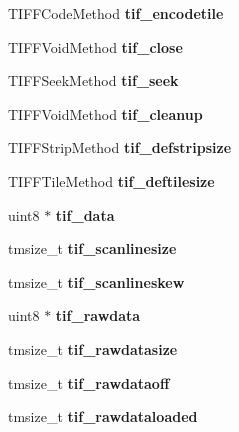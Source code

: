 \begin{DoxyCompactItemize}
T\+I\+F\+F\+Code\+Method {\bfseries tif\+\_\+encodetile}
\item 
\mbox{\label{structtiff_aa7bef3ea331dfead591fa3ee328c2f89}} 
T\+I\+F\+F\+Void\+Method {\bfseries tif\+\_\+close}
\item 
\mbox{\label{structtiff_a1db2f47aa654fbf73a49847336f5a2ab}} 
T\+I\+F\+F\+Seek\+Method {\bfseries tif\+\_\+seek}
\item 
\mbox{\label{structtiff_ab38b688dbaac74b1587df2ab116e37f3}} 
T\+I\+F\+F\+Void\+Method {\bfseries tif\+\_\+cleanup}
\item 
\mbox{\label{structtiff_a6ea2d3cd462422a878877abe7b7b5010}} 
T\+I\+F\+F\+Strip\+Method {\bfseries tif\+\_\+defstripsize}
\item 
\mbox{\label{structtiff_a0d76e386a076004d16128b626603d55d}} 
T\+I\+F\+F\+Tile\+Method {\bfseries tif\+\_\+deftilesize}
\item 
\mbox{\label{structtiff_a8b63d8d183e7208b9bbd0354addb48cd}} 
uint8 $\ast$ {\bfseries tif\+\_\+data}
\item 
\mbox{\label{structtiff_a3497c1342a559a5a2fb1448e84594cc6}} 
tmsize\+\_\+t {\bfseries tif\+\_\+scanlinesize}
\item 
\mbox{\label{structtiff_a961f4a36ee1b1d0cfb8fd5fec5c2c97f}} 
tmsize\+\_\+t {\bfseries tif\+\_\+scanlineskew}
\item 
\mbox{\label{structtiff_af8ccc5951016dacf6335319b85edfe0d}} 
uint8 $\ast$ {\bfseries tif\+\_\+rawdata}
\item 
\mbox{\label{structtiff_ac74efe21c3a3ca6be7ac108bcb5a9e7f}} 
tmsize\+\_\+t {\bfseries tif\+\_\+rawdatasize}
\item 
\mbox{\label{structtiff_acccfff166f9648fc8e5209bba7dd46ab}} 
tmsize\+\_\+t {\bfseries tif\+\_\+rawdataoff}
\item 
\mbox{\label{structtiff_a4c6055fe6967d8002a505a6b27b4e744}} 
tmsize\+\_\+t {\bfseries tif\+\_\+rawdataloaded}

\end{DoxyCompactItemize}
